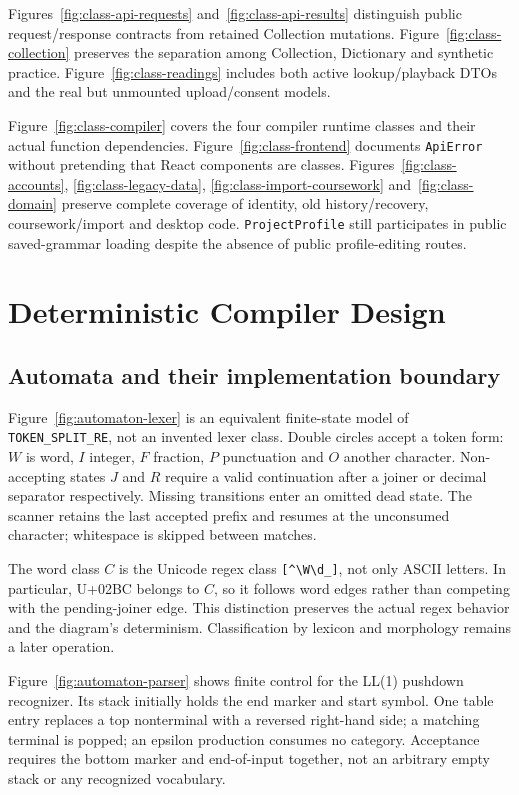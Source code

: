 \documentclass[11pt,a4paper]{article}
\begin{document}
Figures~\ref{fig:class-api-requests} and~\ref{fig:class-api-results} distinguish
public request/response contracts from retained Collection mutations.
Figure~\ref{fig:class-collection} preserves the separation among Collection,
Dictionary and synthetic practice. Figure~\ref{fig:class-readings} includes both
active lookup/playback DTOs and the real but unmounted upload/consent models.

Figure~\ref{fig:class-compiler} covers the four compiler runtime classes and
their actual function dependencies. Figure~\ref{fig:class-frontend} documents
\texttt{ApiError} without pretending that React components are classes.
Figures~\ref{fig:class-accounts}, \ref{fig:class-legacy-data},
\ref{fig:class-import-coursework} and~\ref{fig:class-domain} preserve complete
coverage of identity, old history/recovery, coursework/import and desktop code.
\texttt{ProjectProfile} still participates in public saved-grammar loading
despite the absence of public profile-editing routes.

\section{Deterministic Compiler Design}
\subsection{Automata and their implementation boundary}
Figure~\ref{fig:automaton-lexer} is an equivalent finite-state model of
\nolinkurl{TOKEN_SPLIT_RE}, not an invented lexer class. Double circles accept
a token form: \(W\) is word, \(I\) integer, \(F\) fraction, \(P\) punctuation
and \(O\) another character. Non-accepting states \(J\) and \(R\) require a
valid continuation after a joiner or decimal separator respectively.
Missing transitions enter an omitted dead state.
The scanner retains the last accepted prefix and resumes at the unconsumed
character; whitespace is skipped between matches.

The word class \(C\) is the Unicode regex class
\texttt{[\textasciicircum{}\textbackslash W\textbackslash d\_]}, not only ASCII
letters. In particular, U+02BC belongs to \(C\), so it follows word edges
rather than competing with the pending-joiner edge. This distinction preserves
the actual regex behavior and the diagram's determinism. Classification by
lexicon and morphology remains a later operation.

Figure~\ref{fig:automaton-parser} shows finite control for the LL(1) pushdown
recognizer. Its stack initially holds the end marker and start symbol.
One table entry replaces a top nonterminal with a reversed right-hand side;
a matching terminal is popped; an epsilon production consumes no category.
Acceptance requires the bottom marker and end-of-input together, not an
arbitrary empty stack or any recognized vocabulary.
\end{document}
